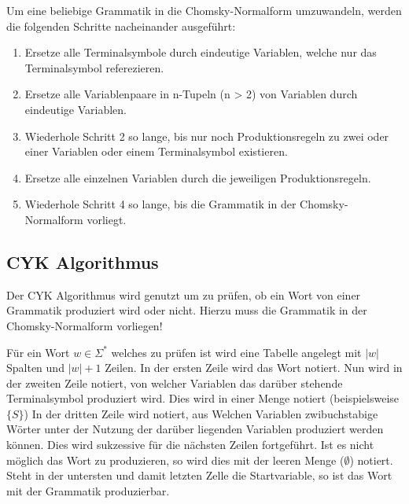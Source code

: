         Um eine beliebige Grammatik in die Chomsky-Normalform umzuwandeln, werden die folgenden Schritte nacheinander ausgeführt:
        \begin{enumerate}
            \item Ersetze alle Terminalsymbole durch eindeutige Variablen, welche nur das Terminalsymbol referezieren.
            \item Ersetze alle Variablenpaare in n-Tupeln (n > 2) von Variablen durch eindeutige Variablen.
            \item Wiederhole Schritt 2 so lange, bis nur noch Produktionsregeln zu zwei oder einer Variablen oder einem Terminalsymbol existieren.
            \item Ersetze alle einzelnen Variablen durch die jeweiligen Produktionsregeln.
            \item Wiederhole Schritt 4 so lange, bis die Grammatik in der Chomsky-Normalform vorliegt.
        \end{enumerate}


    \subsection{CYK Algorithmus}
        Der CYK Algorithmus wird genutzt um zu prüfen, ob ein Wort von einer Grammatik produziert wird oder nicht. Hierzu muss die Grammatik in der Chomsky-Normalform vorliegen!

        Für ein Wort $ w \in \Sigma ^ * $ welches zu prüfen ist wird eine Tabelle angelegt mit $ \vert w \vert $ Spalten und $ \vert w \vert + 1 $ Zeilen. In der ersten Zeile wird das Wort notiert. Nun wird in der zweiten Zeile notiert, von welcher Variablen das darüber stehende Terminalsymbol produziert wird. Dies wird in einer Menge notiert (beispielsweise $ \{ S \} $) In der dritten Zeile wird notiert, aus Welchen Variablen zwibuchstabige Wörter unter der Nutzung der darüber liegenden Variablen produziert werden können. Dies wird sukzessive für die nächsten Zeilen fortgeführt. Ist es nicht möglich das Wort zu produzieren, so wird dies mit der leeren Menge ($ \emptyset $) notiert. Steht in der untersten und damit letzten Zelle die Startvariable, so ist das Wort mit der Grammatik produzierbar.

